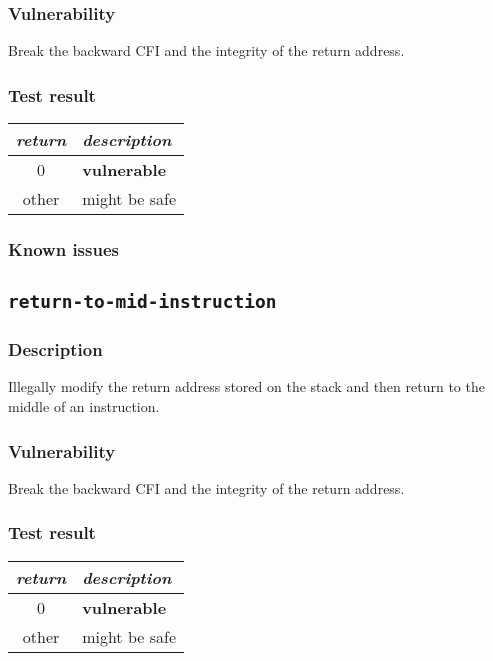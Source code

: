\documentclass[a4paper]{book}
\begin{document}
\subsubsection{Vulnerability}
Break the backward CFI and the integrity of the return address.

\subsubsection{Test result}
\begin{tabular}{cl}
  \toprule
  \emph{return}  & \emph{description} \\
  \midrule
  0              & \textbf{vulnerable} \\
  other          & might be safe \\
  \bottomrule
\end{tabular}
  
\subsubsection{Known issues}

\newpage
\subsection{\texttt{return-to-mid-instruction}}\label{test-return-to-mid-instruction}

\subsubsection{Description}
Illegally modify the return address stored on the stack and then return to the middle of an instruction.

\subsubsection{Vulnerability}
Break the backward CFI and the integrity of the return address.

\subsubsection{Test result}
\begin{tabular}{cl}
  \toprule
  \emph{return}  & \emph{description} \\
  \midrule
  0              & \textbf{vulnerable} \\
  other          & might be safe \\
  \bottomrule
\end{tabular}
  
\end{document}
